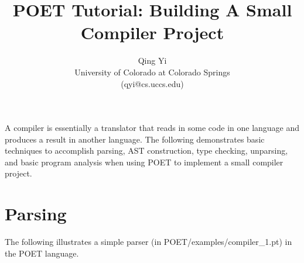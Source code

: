 \documentclass[11pt]{article}
\title{POET Tutorial: Building A Small Compiler Project}
\author{ Qing Yi \\
  University of Colorado at Colorado Springs \\(qyi@cs.uccs.edu) \\
}
\begin{document}
\maketitle

A compiler is essentially a translator that reads in some code in one language and produces 
a result in another language. The following demonstrates basic techniques to accomplish parsing, AST construction, type checking, unparsing, and basic program analysis when using POET to implement a small compiler project.
  
  \section{Parsing}
\label {sec-driver}

The following illustrates a simple parser (in POET/examples/compiler\_1.pt) in the POET language.
\end{document}
